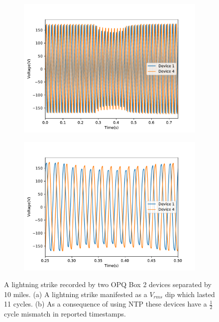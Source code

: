 \begin{figure}[h]
		\centering
	\begin{subfigure}{.5\textwidth}
	  \centering
	  \includegraphics[width=0.9\linewidth]{img/voltage_sag.pdf}
	  \caption{}
	  \label{fig:opq:6:1}
	\end{subfigure}%
	\begin{subfigure}{.5\textwidth}
	  \centering
	  \includegraphics[width=0.9\linewidth]{img/voltage_sag_zoomed_in.pdf}
	  \caption{}
	  \label{fig:opq:6:2}
	\end{subfigure}
	\caption{A lightning strike recorded by two OPQ Box 2 devices separated by 10 miles. (a) A lightning strike manifested as a $V_{rms}$ dip which lasted 11 cycles. (b) As a consequence of using NTP these devices have a $\frac{1}{2}$ cycle mismatch in reported timestamps.}
	\label{fig:opq:6}
\end{figure}


